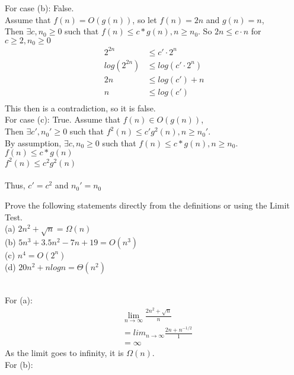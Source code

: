 \documentclass{assignment}
\begin{document}
\begin{problemlist}
\begin{answer}
For case (b): False.\\
Assume that $f(n)=O(g(n))$, so let $f(n) = 2n$ and $g(n) = n$,\\
Then $\exists c, n_{0} \geq 0$ such that $f(n) \leq c*g(n), n \geq n_{0}$.
So $2n \le c\cdot n$ for $c\ge 2, n_0 \ge 0$\\
\begin{align*}
2^{2n}&\le  c'\cdot 2^{n}\\
log(2^{2n})&\le  log(c'\cdot 2^{ n})\\
2n &\le log(c')+ n\\
n & \le log(c')\\
\end{align*}
This then is a contradiction, so it is false.\\
\clearpage
For case (c): True. 
Assume that $f(n) \in O(g(n))$,\\
Then $\exists c', n_{0}' \geq 0$ such that $f^{2}(n) \leq c'g^{2}(n), n \geq n_{0}'$.\\
By assumption, $\exists c, n_{0} \geq 0$ such that $f(n) \leq c*g(n), n \geq n_{0}$.\\
$f(n) \leq c*g(n)$\\
$f^{2}(n) \leq c^{2}g^{2}(n)$\\
\\Thus, $c' = c^{2}$ and $n_{0}' = n_{0}$
\end{answer}
\clearpage
\pbitem
\begin{problem}
Prove the following statements directly from the definitions or using the Limit Test.\\
(a) $2n^2+\sqrt{n}=\Omega (n)$\\
(b) $5n^3+3.5n^2-7n+19=O(n^3)$\\
(c) $n^4=O(2^n)$\\
(d) $20n^2 + nlogn=\Theta (n^2)$\\
\end{problem}
\begin{answer}
\\
For (a):\\
\begin{align*}
&\lim_{n\rightarrow \infty} \frac{2n^2 + \sqrt{n}}{n}\\
&=lim_{n\rightarrow \infty} \frac{2n + n^{-1/2}}{1}\\
&=\infty
\end{align*}
As the limit goes to infinity, it is $\Omega (n)$.\\
For (b):\\
\begin{align*}

\end{align*}
\end{answer}
\end{problemlist}
\end{document}
